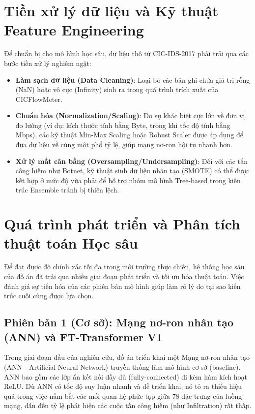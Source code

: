 \documentclass[../DoAn.tex]{subfiles}
\begin{document}
\section{Tiền xử lý dữ liệu và Kỹ thuật Feature Engineering}
Để chuẩn bị cho mô hình học sâu, dữ liệu thô từ CIC-IDS-2017 phải trải qua các bước tiền xử lý nghiêm ngặt:
\begin{itemize}
    \item \textbf{Làm sạch dữ liệu (Data Cleaning)}: Loại bỏ các bản ghi chứa giá trị rỗng (NaN) hoặc vô cực (Infinity) sinh ra trong quá trình trích xuất của CICFlowMeter.
    \item \textbf{Chuẩn hóa (Normalization/Scaling)}: Do sự khác biệt cực lớn về đơn vị đo lường (ví dụ: kích thước tính bằng Byte, trong khi tốc độ tính bằng Mbps), các kỹ thuật Min-Max Scaling hoặc Robust Scaler được áp dụng để đưa dữ liệu về cùng một phổ tỷ lệ, giúp mạng nơ-ron hội tụ nhanh hơn.
    \item \textbf{Xử lý mất cân bằng (Oversampling/Undersampling)}: Đối với các tấn công hiếm như Botnet, kỹ thuật sinh dữ liệu nhân tạo (SMOTE) có thể được kết hợp ở mức độ vừa phải để hỗ trợ nhóm mô hình Tree-based trong kiến trúc Ensemble tránh bị thiên lệch.
\end{itemize}

\section{Quá trình phát triển và Phân tích thuật toán Học sâu}
Để đạt được độ chính xác tối đa trong môi trường thực chiến, hệ thống học sâu của đồ án đã trải qua nhiều giai đoạn phát triển và tối ưu hóa thuật toán. Việc đánh giá sự tiến hóa của các phiên bản mô hình giúp làm rõ lý do tại sao kiến trúc cuối cùng được lựa chọn.

\subsection{Phiên bản 1 (Cơ sở): Mạng nơ-ron nhân tạo (ANN) và FT-Transformer V1}
Trong giai đoạn đầu của nghiên cứu, đồ án triển khai một Mạng nơ-ron nhân tạo (ANN - Artificial Neural Network) truyền thống làm mô hình cơ sở (baseline). ANN bao gồm các lớp ẩn kết nối đầy đủ (fully-connected) đi kèm hàm kích hoạt ReLU. Dù ANN có tốc độ suy luận nhanh và dễ triển khai, nó tỏ ra thiếu hiệu quả trong việc nắm bắt các mối quan hệ phức tạp giữa 78 đặc trưng của luồng mạng, dẫn đến tỷ lệ phát hiện các cuộc tấn công hiếm (như Infiltration) rất thấp.
\end{document}
